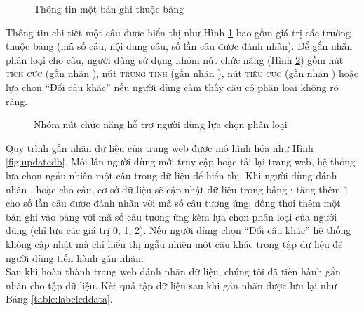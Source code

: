 \begin{figure}[h]
\centering
{}
\caption{Thông tin một bản ghi thuộc bảng }
\label{fig:websen}
\end{figure}

Thông tin chi tiết một câu được hiển thị như Hình \ref{fig:websen} bao gồm giá trị các trường thuộc bảng  (mã số câu, nội dung câu, số lần câu được đánh nhãn). Để gắn nhãn phân loại cho câu, người dùng sử dụng nhóm nút chức năng (Hình \ref{fig:webbtn}) gồm nút \textsc{tích cực} (gắn nhãn \tichcuc), nút \textsc{trung tính} (gắn nhãn \trungtinh), nút \textsc{tiêu cực} (gắn nhãn \tieucuc) hoặc lựa chọn ``Đổi câu khác'' nếu người dùng cảm thấy câu có phân loại không rõ ràng.

\begin{figure}[h]
\centering
{}
\caption{Nhóm nút chức năng hỗ trợ người dùng lựa chọn phân loại}
\label{fig:webbtn}
\end{figure}

Quy trình gắn nhãn dữ liệu của trang web được mô hình hóa như Hình \ref{fig:updatedb}. Mỗi lần người dùng mới truy cập hoặc tải lại trang web, hệ thống lựa chọn ngẫu nhiên một câu trong dữ liệu để hiển thị. Khi người dùng đánh nhãn \tichcuc, \tieucuc hoặc \trungtinh cho câu, cơ sở dữ liệu sẽ cập nhật dữ liệu trong bảng : tăng thêm 1 cho số lần câu được đánh nhãn với mã số câu tương ứng, đồng thời thêm một bản ghi vào bảng  với mã số câu tương ứng kèm lựa chọn phân loại của người dùng (chỉ lưu các giá trị 0, 1, 2). Nếu người dùng chọn ``Đổi câu khác'' hệ thống không cập nhật mà chỉ hiển thị ngẫu nhiên một câu khác trong tập dữ liệu để người dùng tiến hành gán nhãn.\\

Sau khi hoàn thành trang web đánh nhãn dữ liệu, chúng tôi đã tiến hành gắn nhãn cho tập dữ liệu. Kết quả tập dữ liệu sau khi gắn nhãn được lưu lại như Bảng \ref{table:labeleddata}.


